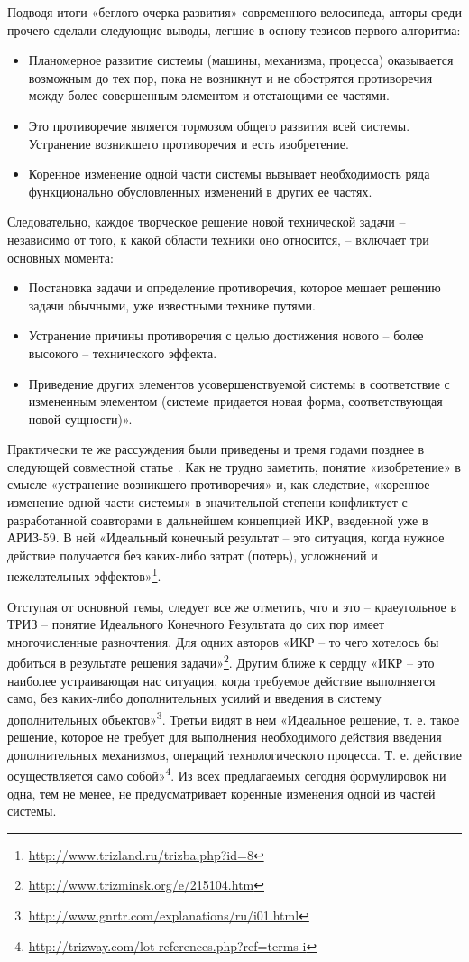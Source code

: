 \documentclass[11pt,a4paper]{article}
\begin{document}
Подводя итоги «беглого очерка развития» современного велосипеда, авторы среди
прочего сделали следующие выводы, легшие в основу тезисов первого алгоритма:
\begin{itemize}
\item[3.] Планомерное развитие системы (машины, механизма, процесса)
  оказывается возможным до тех пор, пока не возникнут и не обострятся
  противоречия между более совершенным элементом и отстающими ее частями.
\item[4.] Это противоречие является тормозом общего развития всей системы.
  Устранение возникшего противоречия и есть изобретение.
\item[5.] Коренное изменение одной части системы вызывает необходимость ряда
  функционально обусловленных изменений в других ее частях.
\end{itemize}
Следовательно, каждое творческое решение новой технической задачи --
независимо от того, к какой области техники оно относится, -- включает три
основных момента:
\begin{itemize}
\item[1.] Постановка задачи и определение противоречия, которое мешает решению
  задачи обычными, уже известными технике путями.
\item[2.] Устранение причины противоречия с целью достижения нового -- более
  высокого -- технического эффекта.
\item[3.] Приведение других элементов усовершенствуемой системы в соответствие
  с измененным элементом (системе придается новая форма, соответствующая новой
  сущности)».
\end{itemize}
Практически те же рассуждения были приведены и тремя годами позднее в
следующей совместной статье \cite{Altshuller1959}. Как не трудно заметить,
понятие «изобретение» в смысле «устранение возникшего противоречия» и, как
следствие, «коренное изменение одной части системы» в значительной степени
конфликтует с разработанной соавторами в дальнейшем концепцией ИКР, введенной
уже в АРИЗ-59.  В ней «Идеальный конечный результат -- это ситуация, когда
нужное действие получается без каких-либо затрат (потерь), усложнений и
нежелательных
эффектов»\footnote{\url{http://www.trizland.ru/trizba.php?id=8}}.

Отступая от основной темы, следует все же отметить, что и это -- краеугольное
в ТРИЗ -- понятие Идеального Конечного Результата до сих пор имеет
многочисленные разночтения. Для одних авторов «ИКР -- то чего хотелось бы
добиться в результате решения
задачи»\footnote{\url{http://www.trizminsk.org/e/215104.htm}}. Другим ближе к
сердцу «ИКР -- это наиболее устраивающая нас ситуация, когда требуемое
действие выполняется само, без каких-либо дополнительных усилий и введения в
систему дополнительных
объектов»\footnote{\url{http://www.gnrtr.com/explanations/ru/i01.html}}.
Третьи видят в нем «Идеальное решение, т. е. такое решение, которое не требует
для выполнения необходимого действия введения дополнительных механизмов,
операций технологического процесса. Т. е. действие осуществляется само
собой»\footnote{\url{http://trizway.com/lot-references.php?ref=terms-i}}. Из
всех предлагаемых сегодня формулировок ни одна, тем не менее, не
предусматривает коренные изменения одной из частей системы.
\end{document}
